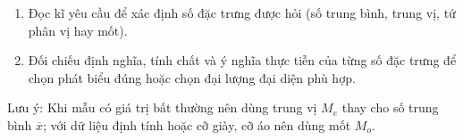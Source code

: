 \begin{enumerate}
\item Đọc kĩ yêu cầu để xác định số đặc trưng được hỏi (số trung bình, trung vị, tứ phân vị hay mốt).
\item Đối chiếu định nghĩa, tính chất và ý nghĩa thực tiễn của từng số đặc trưng để chọn phát biểu đúng hoặc chọn đại lượng đại diện phù hợp.
\end{enumerate}
Lưu ý: Khi mẫu có giá trị bất thường nên dùng trung vị $M_e$ thay cho số trung bình $\overline{x}$; với dữ liệu định tính hoặc cỡ giày, cỡ áo nên dùng mốt $M_o$.
